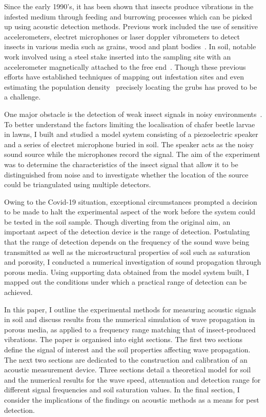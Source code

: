 \documentclass[twocolumn]{article}
\begin{document}
Since the early 1990's, it has been shown that insects produce vibrations in the infested medium through feeding and burrowing processes which can be picked up using acoustic detection methods. Previous work included the use of sensitive accelerometers, electret microphones or laser doppler vibrometers to detect insects in various media such as grains, wood and plant bodies~\cite{mankin_hagstrum_kairo_2011, michelsen_fink_gogala_traue_1982, johnson_crawford_zhang_2007}. In soil, notable work involved using a steel stake inserted into the sampling site with an accelerometer magnetically attached to the free end~\cite{inyang_mankin_2019}. Though these previous efforts have established techniques of mapping out infestation sites and even estimating the population density~\cite{hubbard_mankin_crocker_2001, mankin_hubbard_flanders_2007} precisely locating the grubs has proved to be a challenge.

One major obstacle is the detection of weak insect signals in noisy environments~\cite{vincent_hallman_panneton_2003, mankin_hagstrum_kairo_2011, mankin_mccoy_shapiro_1998}. To better understand the factors limiting the localisation of chafer beetle larvae in lawns, I built and studied a model system consisting of a piezoelectric speaker and a series of electret microphone buried in soil. The speaker acts as the noisy sound source while the microphones record the signal. The aim of the experiment was to determine the characteristics of the insect signal that allow it to be distinguished from noise and to investigate whether the location of the source could be triangulated using multiple detectors.

Owing to the Covid-19 situation, exceptional circumstances prompted a decision to be made to halt the experimental aspect of the work before the system could be tested in the soil sample. Though diverting from the original aim, an important aspect of the detection device is the range of detection. Postulating that the range of detection depends on the frequency of the sound wave being transmitted as well as the microstructural properties of soil such as saturation and porosity, I conducted a numerical investigation of sound propagation through porous media. Using supporting data obtained from the model system built, I mapped out the conditions under which a practical range of detection can be achieved.

In this paper, I outline the experimental methods for measuring acoustic signals in soil and discuss results from the numerical simulation of wave propagation in porous media, as applied to a frequency range matching that of insect-produced vibrations. The paper is organised into eight sections. The first two sections define the signal of interest and the soil properties affecting wave propagation. The next two sections are dedicated to the construction and calibration of an acoustic measurement device. Three sections detail a theoretical model for soil and the numerical results for the wave speed, attenuation and detection range for different signal frequencies and soil saturation values. In the final section, I consider the implications of the findings on acoustic methods as a means for pest detection.
\end{document}
